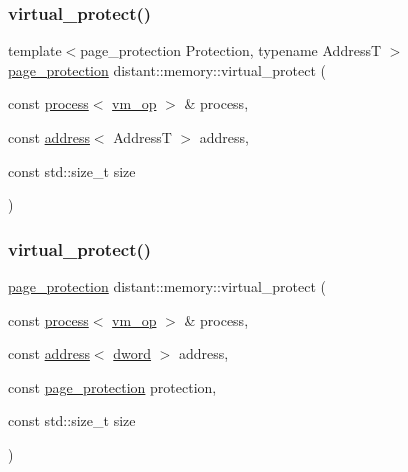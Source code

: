 \mbox{\label{namespacedistant_1_1memory_a66c503d49f2bda7d569060ef957fc763}} 
\subsubsection{\texorpdfstring{virtual\+\_\+protect()}{virtual\_protect()}\hspace{0.1cm}{\footnotesize\ttfamily [3/4]}}
{\footnotesize\ttfamily template$<$page\+\_\+protection Protection, typename AddressT $>$ \\
\mbox{\hyperlink{structdistant_1_1access__rights_a09c6caea8f570f8e2d18c3ef2e2a7804}{page\+\_\+protection}} distant\+::memory\+::virtual\+\_\+protect (\begin{DoxyParamCaption}\item[{const \mbox{\hyperlink{classdistant_1_1kernel__objects_1_1process}{process}}$<$ \mbox{\hyperlink{namespacedistant_af02d4223cd2f509cc373ac9d83655f19}{vm\+\_\+op}} $>$ \&}]{process,  }\item[{const \mbox{\hyperlink{classdistant_1_1memory_1_1address}{address}}$<$ AddressT $>$}]{address,  }\item[{const std\+::size\+\_\+t}]{size }\end{DoxyParamCaption})}

\mbox{\label{namespacedistant_1_1memory_a1d52e5f62c1914f97b4e08a653e9b6fb}} 
\subsubsection{\texorpdfstring{virtual\+\_\+protect()}{virtual\_protect()}\hspace{0.1cm}{\footnotesize\ttfamily [4/4]}}
{\footnotesize\ttfamily \mbox{\hyperlink{structdistant_1_1access__rights_a09c6caea8f570f8e2d18c3ef2e2a7804}{page\+\_\+protection}} distant\+::memory\+::virtual\+\_\+protect (\begin{DoxyParamCaption}\item[{const \mbox{\hyperlink{classdistant_1_1kernel__objects_1_1process}{process}}$<$ \mbox{\hyperlink{namespacedistant_af02d4223cd2f509cc373ac9d83655f19}{vm\+\_\+op}} $>$ \&}]{process,  }\item[{const \mbox{\hyperlink{classdistant_1_1memory_1_1address}{address}}$<$ \mbox{\hyperlink{namespacedistant_a9fa41a5a1a17dcbd24da1c1855c92489}{dword}} $>$}]{address,  }\item[{const \mbox{\hyperlink{structdistant_1_1access__rights_a09c6caea8f570f8e2d18c3ef2e2a7804}{page\+\_\+protection}}}]{protection,  }\item[{const std\+::size\+\_\+t}]{size }\end{DoxyParamCaption})\hspace{0.3cm}{\ttfamily [inline]}}

